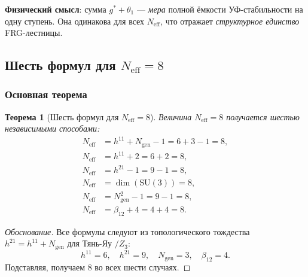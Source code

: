 \documentclass[11pt,a4paper]{article}
\newcommand{\SU}{\ensuremath{\mathrm{SU}}}
\newtheorem{theorem}{Теорема}[section]
\theoremstyle{definition}
\begin{document}
\medskip\noindent
\textbf{Физический смысл}: сумма $g^* + \theta_1$ --- \emph{мера}
полной ёмкости УФ-стабильности на одну ступень. Она одинакова
для всех $N_{\text{eff}}$, что отражает \emph{структурное единство}
FRG-лестницы.

\subsection{Шесть формул для \texorpdfstring{$N_{\text{eff}} = 8$}{N\_eff = 8}}
\label{subsec:frg-neff}

\subsubsection{Основная теорема}

\begin{theorem}[Шесть формул для $N_{\text{eff}} = 8$]
\label{thm:six-formulas}
Величина $N_{\text{eff}} = 8$ получается шестью независимыми способами:
\begin{align}
    N_{\text{eff}} &= h^{11} + N_{\text{gen}} - 1 = 6 + 3 - 1 = 8,
    \label{eq:neff-formula-1} \\[0.3em]
    N_{\text{eff}} &= h^{11} + 2 = 6 + 2 = 8,
    \label{eq:neff-formula-2} \\[0.3em]
    N_{\text{eff}} &= h^{21} - 1 = 9 - 1 = 8,
    \label{eq:neff-formula-3} \\[0.3em]
    N_{\text{eff}} &= \dim(\SU(3)) = 8,
    \label{eq:neff-formula-4} \\[0.3em]
    N_{\text{eff}} &= N_{\text{gen}}^2 - 1 = 9 - 1 = 8,
    \label{eq:neff-formula-5} \\[0.3em]
    N_{\text{eff}} &= \beta_{12} + 4 = 4 + 4 = 8.
    \label{eq:neff-formula-6}
\end{align}
\end{theorem}

\begin{proof}[Обоснование]
Все формулы следуют из топологического тождества
$h^{21} = h^{11} + N_{\text{gen}}$ для Тянь-Яу $/Z_3$:
\begin{equation}
    h^{11} = 6, \quad h^{21} = 9, \quad N_{\text{gen}} = 3, \quad
    \beta_{12} = 4.
\end{equation}
Подставляя, получаем 8 во всех шести случаях.
\end{proof}
\end{document}
